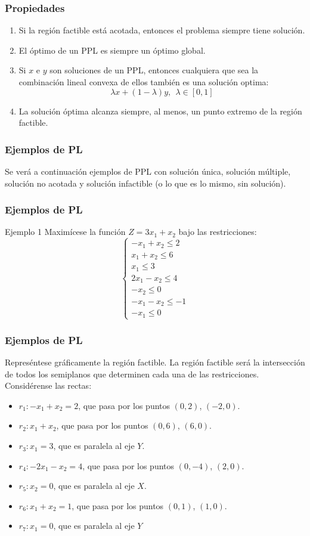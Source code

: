 \documentclass{beamer}
\begin{document}
\begin{frame}
\frametitle{Propiedades}
\begin{enumerate}
\item Si la regi\'on factible est\'a acotada, entonces el problema siempre tiene soluci\'on.
\item El \'optimo de un PPL es siempre un \'optimo global.
\item Si $x$ e $y$ son soluciones de un PPL, entonces cualquiera que sea la combinaci\'on lineal convexa de ellos tambi\'en es una soluci\'on optima:
\[\lambda x + (1-\lambda)y,\ \ \lambda \in [0,1]\]
\item La soluci\'on \'optima alcanza siempre, al menos, un punto extremo de la regi\'on factible.
\end{enumerate}
\end{frame}



\begin{frame}
\frametitle{Ejemplos de PL}
Se ver\'a a continuaci\'on ejemplos de PPL con soluci\'on \'unica, soluci\'on m\'ultiple, soluci\'on no acotada y soluci\'on infactible (o lo que es lo mismo, sin soluci\'on).
\end{frame}


\begin{frame}
\frametitle{Ejemplos de PL}
\begin{block}{Ejemplo 1}
Maxim\'icese la funci\'on $Z=3x_1+x_2$ bajo las restricciones:
\[\left\{\begin{array}{l}-x_1 + x_2 \leq 2 \\x_1+x_2\leq 6 \\x_1\leq 3 \\2x_1-x_2\leq 4 \\-x_2\leq 0 \\-x_1-x_2\leq -1 \\-x_1\leq 0\end{array}\right.\]
\end{block}
\end{frame}

\begin{frame}
\frametitle{Ejemplos de PL}
Repres\'entese gr\'aficamente la regi\'on factible. La regi\'on factible ser\'a la intersecci\'on de todos los semiplanos que determinen cada una de las restricciones. Consid\'erense las rectas:
\begin{itemize}
\item $r_1:-x_1+x_2=2$, que pasa por los puntos $(0,2)$, $(-2,0)$.
\item $r_2:x_1+x_2$, que pasa por los puntos $(0,6)$, $(6,0)$.
\item $r_3:x_1=3$, que es paralela al eje $Y$.
\item $r_4:-2x_1-x_2=4$, que pasa por los puntos $(0,-4)$, $(2,0)$.
\item $r_5:x_2=0$, que es paralela al eje $X$.
\item $r_6:x_1+x_2=1$, que pasa por los puntos $(0,1)$, $(1,0)$.
\item $r_7:x_1=0$, que es paralela al eje $Y$
\end{itemize}
\end{frame}
\end{document}
